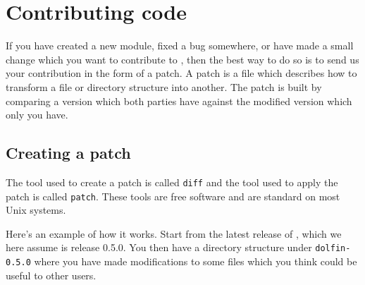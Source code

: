 \chapter{Contributing code}

If you have created a new module, fixed a bug somewhere, or have made
a small change which you want to contribute to \dolfin{}, then the
best way to do so is to send us your contribution in the form of a
patch. A patch is a file which describes how to transform a file or
directory structure into another. The patch is built by comparing a
version which both parties have against the modified version which
only you have.

\section{Creating a patch}

The tool used to create a patch is called \texttt{diff} and the tool
used to apply the patch is called \texttt{patch}. These tools are free
software and are standard on most Unix systems.

Here's an example of how it works. Start from the latest release of
\dolfin{}, which we here assume is release 0.5.0. You then have a
directory structure under \texttt{dolfin-0.5.0} where you have made
modifications to some files which you think could be useful to
other users.

